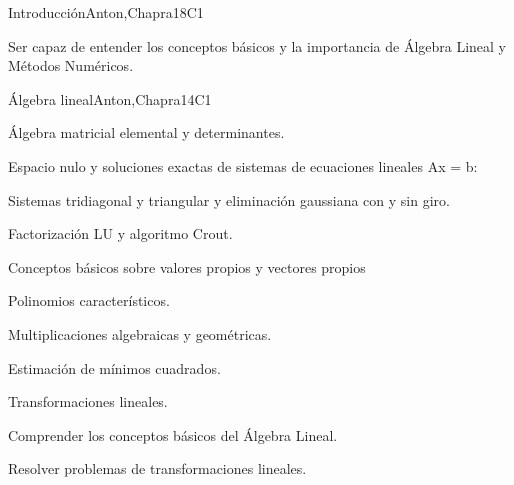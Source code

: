 \begin{syllabus}
\begin{unit}{Introducción}{}{Anton,Chapra}{18}{C1}
   \begin{learningoutcomes}
      \item Ser capaz de entender los conceptos básicos y la importancia de Álgebra Lineal y Métodos Numéricos.
   \end{learningoutcomes}
\end{unit}

\begin{unit}{Álgebra lineal}{}{Anton,Chapra}{14}{C1}
   \begin{topics}
    \item Álgebra matricial elemental y determinantes.
    \item Espacio nulo y soluciones exactas de sistemas de ecuaciones lineales Ax = b:
	  \begin{subtopics}
	    \item Sistemas tridiagonal y triangular y eliminación gaussiana con y sin giro.
	    \item Factorización LU y algoritmo Crout.
	  \end{subtopics}
    \item Conceptos básicos sobre valores propios y vectores propios
	  \begin{subtopics}
	    \item Polinomios característicos.
	    \item Multiplicaciones algebraicas y geométricas.
	  \end{subtopics}
    \item Estimación de mínimos cuadrados.
    \item Transformaciones lineales.
    \end{topics}

   \begin{learningoutcomes}
      \item Comprender los conceptos básicos del Álgebra Lineal.
      \item Resolver problemas de transformaciones lineales.
   \end{learningoutcomes}
\end{unit}


\end{syllabus}
